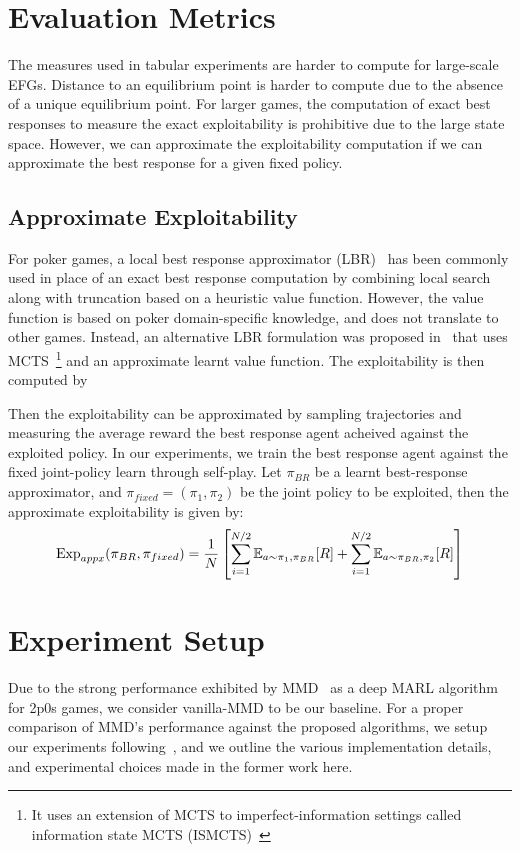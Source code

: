 \section{Evaluation Metrics}
The measures used in tabular experiments are harder to compute for large-scale EFGs.
Distance to an equilibrium point is harder to compute due to the absence of a unique equilibrium
point.
For larger games, the computation of exact best responses to measure the exact exploitability is
prohibitive due to the large state space.
However, we can approximate the exploitability computation if we can approximate the best response
for a given fixed policy.

\subsection{Approximate Exploitability}
For poker games, a local best response approximator (LBR)~\cite{lisyEquilibrium2017} has been
commonly used in place of an exact best response computation by combining local search along with
truncation based on a heuristic value function.
However, the value function is based on poker domain-specific knowledge, and does not translate to
other games.
Instead, an alternative LBR formulation was proposed in~\cite{timbersApproximate2022} that uses
MCTS~\footnote{It uses an extension of MCTS to imperfect-information settings called information
	state MCTS (ISMCTS)~\cite{cowlingInformation2012}} and an approximate learnt value function.
The exploitability is then computed by

Then the exploitability can be
approximated by sampling trajectories and measuring the average reward the best response agent
acheived against the exploited policy.
In our experiments, we train the best response agent against the fixed joint-policy learn through
self-play.
Let $\pi_{BR}$ be a learnt best-response approximator, and $\pi_{fixed}=(\pi_1, \pi_2)$ be the
joint policy to be exploited, then the approximate exploitability is given by:
\begin{equation}
	\label{eqn:appxexp} \text{Exp}_{appx} (\pi_{BR}, \pi_{fixed}) = \frac{1}{N} \left[ \sum_{i=1}^{N/2}
		\mathbb{E}_{a \sim \pi_1, \pi_{BR}} [R] + \sum_{i=1}^{N/2} \mathbb{E}_{a \sim \pi_{BR}, \pi_2} [R] \right]
\end{equation} 

\section{Experiment Setup}
Due to the strong performance exhibited by MMD~\cite{sokotaUnified2023} as a deep MARL algorithm
for 2p0s games, we consider vanilla-MMD to be our baseline.
For a proper comparison of MMD's performance against the proposed algorithms, we setup our
experiments following~\cite{sokotaUnified2023}, and we outline the various implementation details,
and experimental choices made in the former work here.

